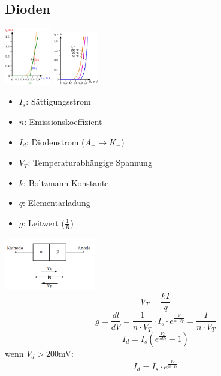 \documentclass[margin=normal]{tex/hsrzf}
\begin{document}
\begin{multicols}{2}
  
  \subsection{Dioden}
  \includegraphics[width = 2cm]{img/Halbleiter/DifferenziellDiode.png}
\includegraphics[width = 2cm]{img/Halbleiter/TemperaturkurvenDiode.png}
{\tiny \begin{itemize}[leftmargin=*]
  \item $I_s$: Sättigungsstrom
  \item $n$: Emissionskoeffizient
  \item $I_d$: Diodenstrom ($A_{+} \rightarrow K_{-}$)
  \item $V_T$: Temperaturabhängige Spannung
  \item $k$: Boltzmann Konstante
  \item $q$: Elementarladung
  \item $g$: Leitwert ($\frac{1}{R}$)
\end{itemize}}
\includegraphics[width = 4cm]{img/Halbleiter/Diode.png}
$$V_T=\frac{kT}{q}$$
 $$g = \frac{dl}{dV}
  = \frac{1}{n \cdot V_T} \cdot I_s \cdot e^{\frac{V}{n\cdot V_T}}
  = \frac{I}{n \cdot V_T}$$
$$I_d =I_s(e^{\frac{V_D}{nV_T}}-1)$$
wenn $V_d > 200$mV: $$I_d = I_s \cdot e^{\frac{V_d}{n \cdot V_t}}$$

\end{multicols}
\end{document}
